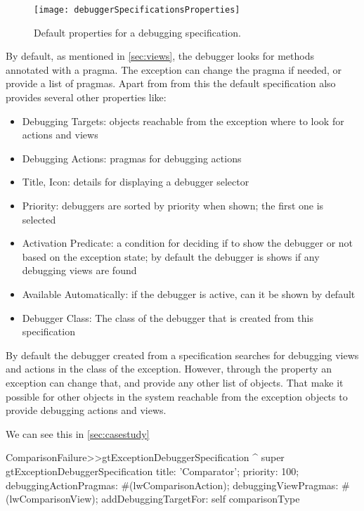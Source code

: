 \documentclass[sigplan,anonymous,review,10pt]{acmart}
\begin{document}
\begin{figure}[h]
  \texttt{[image: debuggerSpecificationsProperties]}
  \caption{Default properties for a debugging specification.}
  \label{fig:debuggerSpecificationsProperties}
\end{figure}


By default, as mentioned in \autoref{sec:views}, the debugger looks for methods  annotated with a  pragma. 
The exception can change the pragma if needed, or provide a list of pragmas. 
Apart from from this the default specification also provides several other properties like:

\begin{itemize}
\item Debugging Targets: objects reachable from the exception where to look for actions and views
\item Debugging Actions: pragmas for debugging actions
\item Title, Icon:  details for displaying a debugger selector
\item Priority:  debuggers are sorted by priority when shown; the first one is selected
\item Activation Predicate: a condition for deciding if to show the debugger or not based on the exception state; by default the debugger is shows if any debugging views are found
\item Available Automatically: if the debugger is active, can it be shown by default
\item Debugger Class: The class of the debugger that is created from this specification
\end{itemize}

By default the debugger created from a specification searches for debugging views and actions in the class of the exception. 
However, through the  property an exception can change that, and provide any other list of objects. 
That make it possible for other objects in the system reachable from the exception objects to provide debugging actions and views.

We can see this in \autoref{sec:casestudy} 

\begin{code}
ComparisonFailure>>gtExceptionDebuggerSpecification
	^ super gtExceptionDebuggerSpecification
		title: 'Comparator';
		priority: 100;
		debuggingActionPragmas: #(lwComparisonAction);
		debuggingViewPragmas: #(lwComparisonView);
		addDebuggingTargetFor: self comparisonType
\end{code}
\end{document}
